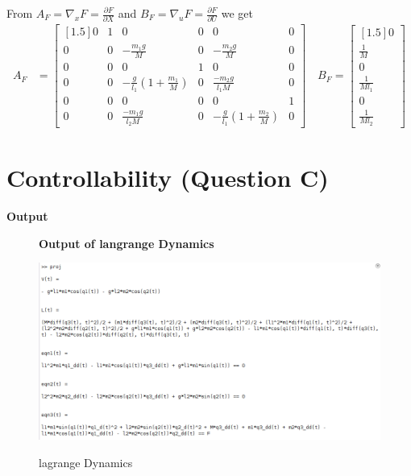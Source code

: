 \documentclass[12pt]{article}
\begin{document}
From $A_F = \nabla_xF=\frac{\partial F}{\partial X}$ and $B_F=\nabla_uF=\frac{\partial F}{\partial U}$ we get 
\begin{align}
  A_F&=
  \begin{bmatrix}[1.5]
   0 &1 &0 &0 &0 &0 \\
   0 &0 &-\frac{m_1g}{M} &0 &-\frac{m_2g}{M} &0 \\
   0 &0 &0 &1 &0 &0 \\
   0 &0 &-\frac{g}{l_1}(1+\frac{m_1}{M}) &0 &\frac{-m_2g}{l_1M} &0  \\
   0 &0 &0 &0 &0 &1 \\
   0 &0 &\frac{-m_1g}{l_2M} &0 &-\frac{g}{l_1}(1+\frac{m_2}{M}) &0 
  \end{bmatrix}
 \quad
  B_F =
  \begin{bmatrix}[1.5]
    0\\
    \frac{1}{M} \\
    0 \\
    \frac{1}{Ml_1}\\
    0 \\
    \frac{1}{Ml_2}
  \end{bmatrix}
\end{align}
\section{Controllability (Question C)}
\textbf{Output}
\begin{figure}[H]
    \centering
    \textbf{Output of langrange Dynamics}\par\medskip
    \includegraphics[scale = 0.5]{lagrange.png}\\[0.0 cm]	%
    \caption{lagrange Dynamics} 
\end{figure}
\end{document}

